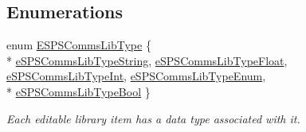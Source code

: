 \subsection*{Enumerations}
\begin{DoxyCompactItemize}
\item 
enum \hyperlink{group___scope_comms_ga3d928ff358bdf470a2c9881b13e4c1ff}{E\+S\+P\+S\+Comms\+Lib\+Type} \{ \\*
\hyperlink{group___scope_comms_gga3d928ff358bdf470a2c9881b13e4c1ffae1567564bee6ed1d083d9ad88a487f33}{e\+S\+P\+S\+Comms\+Lib\+Type\+String}, 
\hyperlink{group___scope_comms_gga3d928ff358bdf470a2c9881b13e4c1ffad5163ec44c6aa9882a563ddb372c55a8}{e\+S\+P\+S\+Comms\+Lib\+Type\+Float}, 
\hyperlink{group___scope_comms_gga3d928ff358bdf470a2c9881b13e4c1ffa9288c8d590e851915ce81e628ea89015}{e\+S\+P\+S\+Comms\+Lib\+Type\+Int}, 
\hyperlink{group___scope_comms_gga3d928ff358bdf470a2c9881b13e4c1ffadb3a82a0bcc43d50be8d8ab832facc74}{e\+S\+P\+S\+Comms\+Lib\+Type\+Enum}, 
\\*
\hyperlink{group___scope_comms_gga3d928ff358bdf470a2c9881b13e4c1ffad2decf6377819b133f790a8cdb7a21a3}{e\+S\+P\+S\+Comms\+Lib\+Type\+Bool}
 \}
\begin{DoxyCompactList}\small\item\em Each editable library item has a data type associated with it. \end{DoxyCompactList}\end{DoxyCompactItemize}
